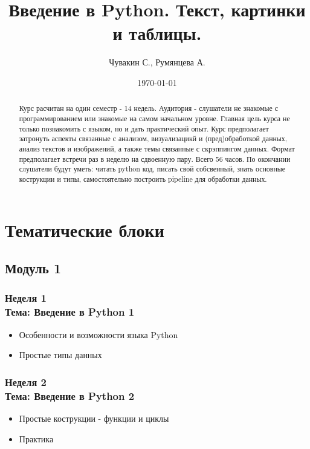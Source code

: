 \documentclass[a4paper,11pt]{article}
\author{Чувакин С., Румянцева А.}
\title{Введение в Python. Текст, картинки и таблицы.}
\date{\today}
\begin{document}
\renewcommand{\abstractname}{Концепция} %

\maketitle

\begin{abstract}
     Курс расчитан на один семестр - 14 недель. Аудитория - слушатели не знакомые с программированием или знакомые на самом начальном уровне. Главная цель курса не только познакомить с языком, но и дать практический опыт. Курс предполагает затронуть аспекты связанные с анализом, визуализацикй и (пред)обработкой данных, анализ текстов и изображений, а также темы связанные с скрэппингом данных. Формат предполагает встречи раз в неделю на сдвоенную пару. Всего 56 часов. По окончании слушатели будут уметь: читать python код, писать свой собсвенный, знать основные кострукции и типы, самостоятельно построить pipeline для обработки данных.
\end{abstract}

\section{Тематические блоки}

\subsection{Модуль 1}

\subsubsection{Неделя 1\\ Тема: Введение в Python 1}

\begin{itemize}
    \item  Особенности и возможности языка Python
    \item  Простые типы данных
\end{itemize}

\subsubsection{Неделя 2\\ Тема: Введение в Python 2}

\begin{itemize}
    \item  Простые кострукции - функции и циклы
    \item  Практика
\end{itemize}
\end{document}
